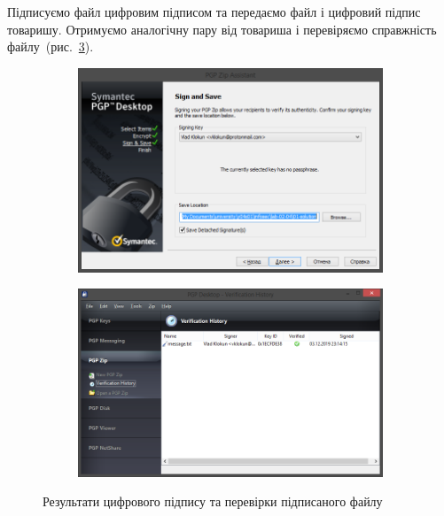 \documentclass[
	a4paper,
	oneside,
	BCOR = 10mm,
	DIV = 12,
	12pt,
	headings = normal,
]{scrartcl}
\newlength{\gridunitwidth}
\begin{document}
		Підписуємо файл цифровим підписом та передаємо файл і цифровий підпис товаришу. Отримуємо аналогічну пару від товариша і перевіряємо справжність файлу~(рис.~\ref{fig:sign-verify-file}).

		\begin{figure}[!htbp]
			\begin{subfigure}[b]{6 \gridunitwidth - 1em / (2-1)}
				\includegraphics[width = \columnwidth]{./assets/p16.png}
				\caption{}
				\label{subfig:sign}
			\end{subfigure}%
			\hspace{1em}%
			\begin{subfigure}[b]{6 \gridunitwidth - 1em / (2-1)}
				\includegraphics[width = \columnwidth]{./assets/p17.png}
				\caption{}
				\label{subfig:verify}
			\end{subfigure}
			\caption{Результати цифрового підпису та перевірки підписаного файлу}
			\label{fig:sign-verify-file}
		\end{figure}
\end{document}
